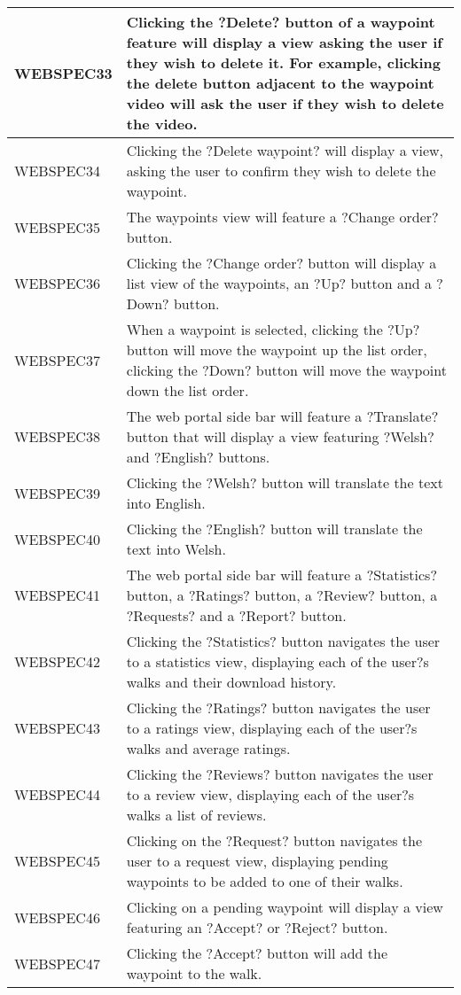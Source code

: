 \documentclass[11pt,a4paper]{article}
\begin{document}
\begin{longtable}{|p{2.5cm}p{13cm}|}
WEBSPEC33 & Clicking the ?Delete? button of a waypoint feature will display a view asking the user if they wish to delete it. For example, clicking the delete button adjacent to the waypoint video will ask the user if they wish to delete the video. \\ \hline
WEBSPEC34 & Clicking the ?Delete waypoint? will display a view, asking the user to confirm they wish to delete the waypoint. \\ \hline
WEBSPEC35 & The waypoints view will feature a ?Change order? button. \\ \hline
WEBSPEC36 & Clicking the ?Change order? button will display a list view of the waypoints, an ?Up? button and a ?Down? button. \\ \hline
WEBSPEC37 & When a waypoint is selected, clicking the ?Up? button will move the waypoint up the list order, clicking the ?Down? button will move the waypoint down the list order. \\ \hline
WEBSPEC38 & The web portal side bar will feature a ?Translate? button that will display a view featuring ?Welsh? and ?English? buttons. \\ \hline
WEBSPEC39 & Clicking the ?Welsh? button will translate the text into English. \\ \hline
WEBSPEC40 & Clicking the ?English? button will translate the text into Welsh. \\ \hline
WEBSPEC41 & The web portal side bar will feature a ?Statistics? button, a ?Ratings? button, a ?Review? button, a ?Requests? and a ?Report? button. \\ \hline
WEBSPEC42 & Clicking the ?Statistics? button navigates the user to a statistics view, displaying each of the user?s walks and their download history. \\ \hline
WEBSPEC43 & Clicking the ?Ratings? button navigates the user to a ratings view, displaying each of the user?s walks and average ratings. \\ \hline
WEBSPEC44 & Clicking the ?Reviews? button navigates the user to a review view, displaying each of the user?s walks a list of reviews. \\ \hline
WEBSPEC45 & Clicking on the ?Request? button navigates the user to a request view, displaying pending waypoints to be added to one of their walks. \\ \hline
WEBSPEC46 & Clicking on a pending waypoint will display a view featuring an ?Accept? or ?Reject? button. \\ \hline
WEBSPEC47 & Clicking the ?Accept? button will add the waypoint to the walk. \\ \hline

\end{longtable}
\end{document}
